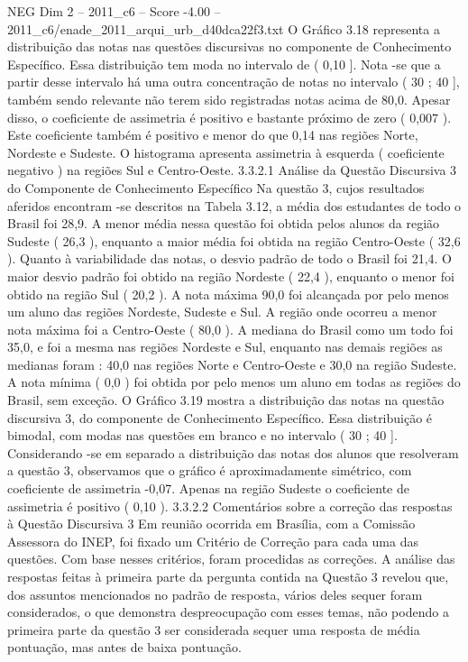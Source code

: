 \begin{textsample}{NEG Dim 2 – 2011\_c6 – Score -4.00 – 2011\_c6/enade\_2011\_arqui\_urb\_d40dca22f3.txt}
O Gráfico 3.18 representa a distribuição das notas nas questões discursivas no componente de Conhecimento Específico.
Essa distribuição tem moda no intervalo de ( 0,10 ].
Nota -se que a partir desse intervalo há uma outra concentração de notas no intervalo ( 30 ; 40 ], também sendo relevante não terem sido registradas notas acima de 80,0.
Apesar disso, o coeficiente de assimetria é positivo e bastante próximo de zero ( 0,007 ).
Este coeficiente também é positivo e menor do que 0,14 nas regiões Norte, Nordeste e Sudeste.
O histograma apresenta assimetria à esquerda ( coeficiente negativo ) na regiões Sul e Centro-Oeste. 3.3.2.1 Análise da Questão Discursiva 3 do Componente de Conhecimento Específico Na questão 3, cujos resultados aferidos encontram -se descritos na Tabela 3.12, a média dos estudantes de todo o Brasil foi 28,9.
A menor média nessa questão foi obtida pelos alunos da região Sudeste ( 26,3 ), enquanto a maior média foi obtida na região Centro-Oeste ( 32,6 ).
Quanto à variabilidade das notas, o desvio padrão de todo o Brasil foi 21,4.
O maior desvio padrão foi obtido na região Nordeste ( 22,4 ), enquanto o menor foi obtido na região Sul ( 20,2 ).
A nota máxima 90,0 foi alcançada por pelo menos um aluno das regiões Nordeste, Sudeste e Sul.
A região onde ocorreu a menor nota máxima foi a Centro-Oeste ( 80,0 ).
A mediana do Brasil como um todo foi 35,0, e foi a mesma nas regiões Nordeste e Sul, enquanto nas demais regiões as medianas foram : 40,0 nas regiões Norte e Centro-Oeste e 30,0 na região Sudeste.
A nota mínima ( 0,0 ) foi obtida por pelo menos um aluno em todas as regiões do Brasil, sem exceção.
O Gráfico 3.19 mostra a distribuição das notas na questão discursiva 3, do componente de Conhecimento Específico.
Essa distribuição é bimodal, com modas nas questões em branco e no intervalo ( 30 ; 40 ].
Considerando -se em separado a distribuição das notas dos alunos que resolveram a questão 3, observamos que o gráfico é aproximadamente simétrico, com coeficiente de assimetria -0,07.
Apenas na região Sudeste o coeficiente de assimetria é positivo ( 0,10 ). 3.3.2.2 Comentários sobre a correção das respostas à Questão Discursiva 3 Em reunião ocorrida em Brasília, com a Comissão Assessora do INEP, foi fixado um Critério de Correção para cada uma das questões.
Com base nesses critérios, foram procedidas as correções.
A análise das respostas feitas à primeira parte da pergunta contida na Questão 3 revelou que, dos assuntos mencionados no padrão de resposta, vários deles sequer foram considerados, o que demonstra despreocupação com esses temas, não podendo a primeira parte da questão 3 ser considerada sequer uma resposta de média pontuação, mas antes de baixa pontuação.

\end{textsample}
